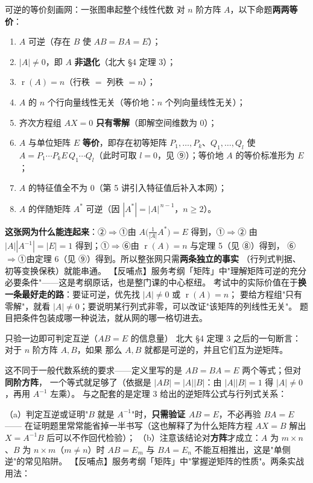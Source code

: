 \begin{fdeep}{可逆的等价刻画网：一张图串起整个线性代数}
对 $n$ 阶方阵 $A$，以下命题\textbf{两两等价}：
\begin{enumerate}[leftmargin=2.0em,itemsep=0.18em]
\item $A$ 可逆（存在 $B$ 使 $AB=BA=E$）；
\item $|A|\ne 0$，即 $A$ \textbf{非退化}（北大 §4 定理 3）；
\item $\operatorname{r}(A)=n$（行秩 $=$ 列秩 $=n$）；
\item $A$ 的 $n$ 个行向量线性无关（等价地：$n$ 个列向量线性无关）；
\item 齐次方程组 $AX=0$ \textbf{只有零解}（即解空间维数为 $0$）；
\item $A$ 与单位矩阵 $E$ \textbf{等价}，即存在初等矩阵 $P_1,\dots,P_k$、$Q_1,\dots,Q_l$ 使
      $A=P_1\cdots P_kE\,Q_1\cdots Q_l$（此时可取 $l=0$，见 ⑨）；等价地 $A$ 的等价标准形为 $E$；
\item $A$ 的特征值全不为 $0$（第 5 讲引入特征值后补入本网）；
\item $A$ 的伴随矩阵 $A^{*}$ 可逆（因 $|A^{*}|=|A|^{\,n-1}$，$n\ge2$）。
\end{enumerate}
\textbf{这张网为什么能连起来}：②$\Rightarrow$①由 $A\bigl(\tfrac{1}{|A|}A^{*}\bigr)=E$ 得到，①$\Rightarrow$②
由 $|A||A^{-1}|=|E|=1$ 得到；①$\Rightarrow$⑥由 $\operatorname{r}(A)=n$ 与定理 5（见 ⑧）得到，
⑥$\Rightarrow$①由定理 6（见 ⑨）得到。所以整张网只需\textbf{两条独立的事实}
（行列式判据、初等变换保秩）就能串通。
【反哺点】服务考纲「矩阵」中"理解矩阵可逆的充分必要条件"——这是考纲原话，也是整门课的中心枢纽。
考试中的实际价值在于\textbf{换一条最好走的路}：要证可逆，优先找 $|A|\ne0$ 或 $\operatorname{r}(A)=n$；
要给方程组"只有零解"，就看 $|A|\ne0$；要说明某行列式非零，可以改证"该矩阵的列线性无关"。
题目把条件包装成哪一种说法，就从网的哪一格切进去。
\end{fdeep}

\begin{fdeep}{只验一边即可判定互逆（$AB=E$ 的信息量）}
北大 §4 定理 3 之后的一句断言：对于 $n$ 阶方阵 $A,B$，如果
那么 $A,B$ 就都是可逆的，并且它们互为逆矩阵。

这不同于一般代数系统的要求——定义里写的是 $AB=BA=E$ 两个等式；但对\textbf{同阶方阵}，
一个等式就足够了（依据是 $|AB|=|A||B|$：由 $|A||B|=1$ 得 $|A|\ne0$，再用 $A^{-1}$ 左乘）。
与之配套的是定理 3 给出的逆矩阵公式与行列式关系：

（a）判定互逆或证明"$B$ 就是 $A^{-1}$"时，\textbf{只需验证 $AB=E$}，不必再验 $BA=E$——
在证明题里常常能省掉一半书写（这也解释了为什么矩阵方程 $AX=B$ 解出 $X=A^{-1}B$ 后可以不作回代检验）；
（b）注意该结论对\textbf{方阵}才成立：$A$ 为 $m\times n$、$B$ 为 $n\times m$（$m\ne n$）时
$AB=E_m$ 与 $BA=E_n$ 不能互相推出，这是"单侧逆"的常见陷阱。
【反哺点】服务考纲「矩阵」中"掌握逆矩阵的性质"。两条实战用法：
\end{fdeep}


